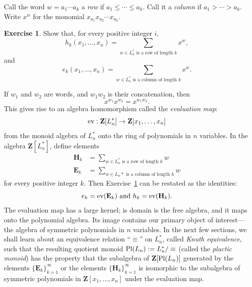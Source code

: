 \documentclass[11pt]{amsproc}
\theoremstyle{definition}
\theoremstyle{example}
\newtheorem{exercise}[theorem]{Exercise}
\newcommand{\ev}{\textup{ev}}
\newcommand{\pl}{\textup{Pl}}
\begin{document}
Call the word $w=a_1\dotsb a_k$ a \emph{row} if $a_1\leq \dotsb \leq a_k$.
Call it a \emph{column} if $a_1>\dotsb>a_k$.
Write $x^w$ for the monomial $x_{a_1}x_{a_2}\dotsb x_{a_k}$.
\begin{exercise}
  \label{exercise:row-col}
  Show that, for every positive integer $i$,
  \begin{displaymath}
    h_k(x_1,\dotsc, x_n) = \sum_{\text{$w\in L_n^*$ is a row of length $k$}}x^w,
  \end{displaymath}
  and 
  \begin{displaymath}
    e_k(x_1,\dotsc, x_n) = \sum_{\text{$w\in L_n^*$ is a column of length $k$}}x^w.
  \end{displaymath}
\end{exercise}
If $w_1$ and $w_2$ are words, and $w_1w_2$ is their concatenation, then
\begin{displaymath}
  x^{w_1}x^{w_2} = x^{w_1w_2}.
\end{displaymath}
This gives rise to an algebra homomorphism called the \emph{evaluation map}:
\begin{displaymath}
\ev:\mathbf Z[L_n^*]\to \mathbf Z[x_1,\dotsc, x_n]
\end{displaymath}
from the monoid algebra of $L_n^*$ onto the ring of polynomials in $n$ variables.
In the algebra $\mathbf Z[L_n^*]$, define elements
\begin{align*}
  \mathbf H_k & = \sum_{\text{$w\in L_n^*$ is a row of length $k$}} w\\
  \mathbf E_k & = \sum_{\text{$w\in L_n*$ is a column of length $k$}} w
\end{align*}
for every positive integer $k$.
Then Exercise~\ref{exercise:row-col} can be restated as the identities:
\begin{displaymath}
  e_k = \ev(\mathbf E_k) \text{ and } h_k = \ev(\mathbf H_k).
\end{displaymath}
The evaluation map has a large kernel; is domain is the free algebra, and it maps onto the polynomial algebra.
Its image contains our primary object of interest---the algebra of symmetric polynomials in $n$ variables.
In the next few sections, we shall learn about an equivalence relation ``$\equiv$'' on $L_n^*$, called \emph{Knuth equivalence}, such that the resulting quotient monoid $\pl(L_n):=L_n^*/\equiv$ (called the \emph{plactic monoid}) has the property that the subalgebra of $\mathbf Z[\pl(L_n)]$ generated by the elements $\{\mathbf E_k\}_{k=1}^\infty$ or the elements $\{\mathbf H_k\}_{k=1}^\infty$ is isomorphic to the subalgebra of symmetric polynomials in $\mathbf Z[x_1,\dotsc, x_n]$ under the evaluation map.
\end{document}
